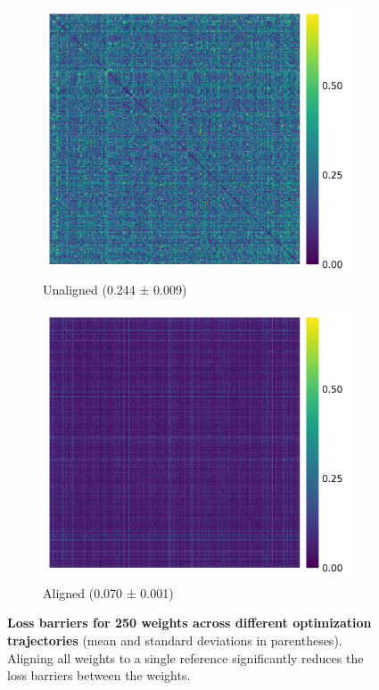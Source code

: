 \begin{figure}[h!]
    \centering
    \begin{subfigure}{0.47\linewidth}
        \centering
        \includegraphics[width=\linewidth]{figures/uci_17/uci_17_unaligned.png}
        \caption{Unaligned (0.244 ± 0.009)}
        \label{fig:uci_unaligned}
    \end{subfigure}
    \begin{subfigure}{0.47\linewidth}
        \centering
        \includegraphics[width=\linewidth]{figures/uci_17/uci_17_aligned.png}
        \caption{Aligned (0.070 ± 0.001)}
        \label{fig:uci_aligned}
    \end{subfigure}
    \caption{\label{fig:uci_alignment}\textbf{Loss barriers for 250 weights across different optimization trajectories} (mean and standard deviations in parentheses). Aligning all weights to a single reference significantly reduces the loss barriers between the weights. } 
\end{figure}

